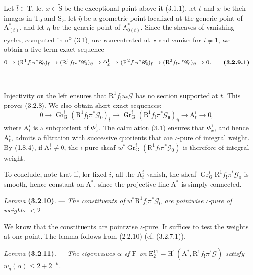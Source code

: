 \documentclass[11pt,leqno]{article}
\newcommand{\Page}[1]{\ifvmode\noindent\else\unskip\ \fi{\footnotesize\textcolor{gray}{[p.\,#1]}}\ \ignorespaces}
\begin{document}
Let \(\bar{t}\in\mathrm{T}\), let \(x\in\widetilde{\mathrm{S}}\) be the exceptional point above it (3.1.1), let \(t\) and \(x\) be their images in \(\mathrm{T}_0\) and \(\mathrm{S}_0\), let \(\bar{\eta}\) be a geometric point localized at the generic point of \(\mathrm{A}_{(t)}^*\), and let \(\eta\) be the generic point of \(\mathrm{A}_{0(t)}^*\). Since the sheaves of vanishing cycles, computed in n\textsuperscript{o} (3.1), are concentrated at \(x\) and vanish for \(i\neq1\), we obtain a five-term exact sequence:
\[
0\to(\mathrm{R}^1f_!\pi^*\mathscr{G}_0)_{\bar{t}}
\to(\mathrm{R}^1f_!\pi^*\mathscr{G}_0)_{\bar{\eta}}
\to\Phi_{\bar{x}}^1
\to(\mathrm{R}^2f_!\pi^*\mathscr{G}_0)_{\bar{t}}
\to(\mathrm{R}^2f_!\pi^*\mathscr{G}_0)_{\bar{\eta}}\to0.
\tag*{\textbf{(3.2.9.1)}}
\]

\Page{203}

Injectivity on the left ensures that \(\mathrm{R}^1f_!\bar{u}_*\mathscr{G}\) has no section supported at \(t\). This proves (3.2.8). We also obtain short exact sequences:
\[
0\to\operatorname{Gr}_{\mathrm{G}}^i
(\mathrm{R}^1f_!\pi^*\mathscr{G}_0)_{\bar{t}}
\to\operatorname{Gr}_{\mathrm{G}}^i
(\mathrm{R}^1f_!\pi^*\mathscr{G}_0)_{\bar{\eta}}
\to\mathrm{A}_t^i\to0,
\]
where \(\mathrm{A}_t^i\) is a subquotient of \(\Phi_{\bar{x}}^1\). The calculation (3.1) ensures that \(\Phi_{\bar{x}}^1\), and hence \(\mathrm{A}_t^i\), admits a filtration with successive quotients that are \(\iota\)-pure of integral weight. By (1.8.4), if \(\mathrm{A}_t^i\neq0\), the \(\iota\)-pure sheaf \(w^*\operatorname{Gr}_{\mathrm{G}}^i(\mathrm{R}^1f_!\pi^*\mathscr{G}_0)\) is therefore of integral weight.

To conclude, note that if, for fixed \(i\), all the \(\mathrm{A}_t^i\) vanish, the sheaf \(\operatorname{Gr}_{\mathrm{G}}^i\mathrm{R}^1f_!\pi^*\mathscr{G}_0\) is smooth, hence constant on \(\mathrm{A}^*\), since the projective line \(\mathrm{A}^*\) is simply connected.

\textit{Lemma} \textbf{(3.2.10)}. — \textit{The constituents of \(w^*\mathrm{R}^1f_!\pi^*\mathscr{G}_0\) are pointwise \(\iota\)-pure of weights \(<2\).}

We know that the constituents are pointwise \(\iota\)-pure. It suffices to test the weights at one point. The lemma follows from (2.2.10) (cf. (3.2.7.1)).

\textit{Lemma} \textbf{(3.2.11)}. — \textit{The eigenvalues \(\alpha\) of \(\mathrm{F}\) on \(\mathrm{E}_2^{11}=\mathrm{H}^1(\mathrm{A}^*,\mathrm{R}^1f_!\pi^*\mathscr{G})\) satisfy \(w_q(\alpha)\leq2+2^{-k}\).}
\end{document}
